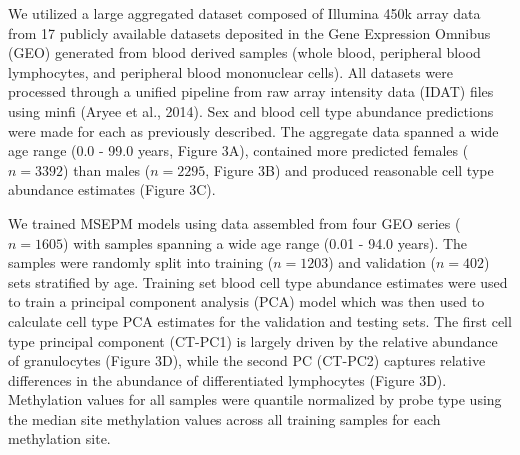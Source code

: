 \documentclass{article}
\begin{document}
{\begin{linenumbers}
We utilized a large aggregated dataset composed of Illumina 450k array data from 17 publicly available 
datasets \cite{Ventham2016-qj,Demetriou2013-wb,Polidoro2013-xv,Johansson2013-of,Arloth2020-lo,Liu2013-dg,Soriano-Tarraga2016-uq,Chuang2017-nk,Zannas2019-me,Kurushima2019-pe,Voisin2015-lh,Tan2014-sg,Tserel2015-ro,Butcher2017-oz,Dabin2020-iw,Marabita2013-cj,ValleG2019-xi} 
deposited in the Gene Expression Omnibus \cite{Barrett2012-gu} (GEO) generated from blood derived samples 
(whole blood, peripheral blood lymphocytes, and peripheral blood mononuclear cells). All datasets were processed 
through a unified pipeline from raw array intensity data (IDAT) files using minfi (Aryee et al., 2014). Sex and 
blood cell type abundance predictions were made for each as previously described\cite{Houseman2012-rr,Aryee2014-ky}. 
The aggregate data spanned a wide age range (0.0  - 99.0 years, Figure 3A), contained more predicted females 
($n=3392$) than males ($n=2295$, Figure 3B) and produced reasonable cell type abundance estimates (Figure 3C). 

We trained MSEPM models using data assembled from four GEO 
series\cite{Johansson2013-of,Liu2013-dg,Butcher2017-oz,Damaso2020-gd}  ($n=1605$) with samples spanning a wide age 
range (0.01 - 94.0 years). The samples were randomly split into training ($n=1203$) and validation ($n=402$) sets 
stratified by age. Training set blood cell type abundance estimates were used to train a principal component analysis 
(PCA) model which was then used to calculate cell type PCA estimates for the validation and testing sets. The first 
cell type principal component (CT-PC1) is largely driven by the relative abundance of granulocytes (Figure 3D), while 
the second PC (CT-PC2) captures relative differences in the abundance of differentiated lymphocytes (Figure 3D).  
Methylation values for all samples were quantile normalized by probe type \cite{Horvath2013-sk} using the median 
site methylation values across all training samples for each methylation site.


\end{linenumbers}}
\end{document}
